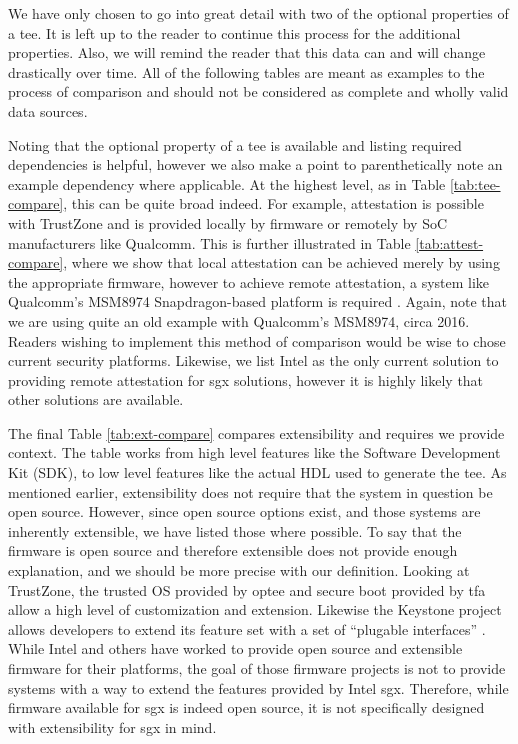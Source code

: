 We have only chosen to go into great detail with two of the optional properties of a \gls{tee}. It is left up to the reader to continue this process for the additional properties. Also, we will remind the reader that this data can and will change drastically over time. All of the following tables are meant as examples to the process of comparison and should not be considered as complete and wholly valid data sources.

Noting that the optional property of a \gls{tee} is available and listing required dependencies is helpful, however we also make a point to parenthetically note an example dependency where applicable. At the highest level, as in Table \ref{tab:tee-compare}, this can be quite broad indeed. For example, \gls{attestation} is possible with TrustZone and is provided locally by firmware or remotely by SoC manufacturers like Qualcomm. This is further illustrated in Table \ref{tab:attest-compare}, where we show that local \gls{attestation} can be achieved merely by using the appropriate firmware, however to achieve remote \gls{attestation}, a system like Qualcomm's MSM8974 Snapdragon-based platform is required \cite{spensky2016sok}. Again, note that we are using quite an old example with Qualcomm's MSM8974, circa 2016. Readers wishing to implement this method of comparison would be wise to chose current security platforms. Likewise, we list Intel as the only current solution to providing remote \gls{attestation} for \gls{sgx} solutions, however it is highly likely that other solutions are available.

The final Table \ref{tab:ext-compare} compares extensibility and requires we provide context. The table works from high level features like the Software Development Kit (SDK), to low level features like the actual HDL used to generate the \gls{tee}. As mentioned earlier, extensibility does not require that the system in question be open source. However, since open source options exist, and those systems are inherently extensible, we have listed those where possible. To say that the firmware is open source and therefore extensible does not provide enough explanation, and we should be more precise with our definition. Looking at TrustZone, the trusted OS provided by \gls{optee} and secure boot provided by \gls{tfa} allow a high level of customization and extension. Likewise the Keystone project allows developers to extend its feature set with a set of ``plugable interfaces'' \cite{lee2019keystone}. While Intel and others have worked to provide open source and extensible firmware for their platforms, the goal of those firmware projects is not to provide systems with a way to extend the features provided by Intel \gls{sgx}. Therefore, while firmware available for \gls{sgx} is indeed open source, it is not specifically designed with extensibility for \gls{sgx} in mind.

